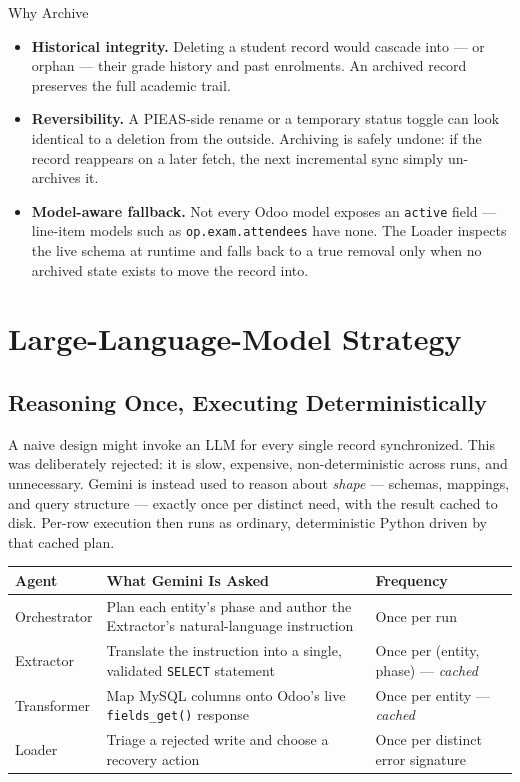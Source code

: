 \documentclass[11pt,a4paper]{article}
\begin{document}
\begin{principlebox}{Why Archive}
\begin{itemize}
  \item \textbf{Historical integrity.} Deleting a student record would cascade into --- or orphan --- their grade history and past enrolments. An archived record preserves the full academic trail.
  \item \textbf{Reversibility.} A PIEAS-side rename or a temporary status toggle can look identical to a deletion from the outside. Archiving is safely undone: if the record reappears on a later fetch, the next incremental sync simply un-archives it.
  \item \textbf{Model-aware fallback.} Not every Odoo model exposes an \texttt{active} field --- line-item models such as \texttt{op.exam.attendees} have none. The Loader inspects the live schema at runtime and falls back to a true removal only when no archived state exists to move the record into.
\end{itemize}
\end{principlebox}

\newpage
\section{Large-Language-Model Strategy}

\subsection{Reasoning Once, Executing Deterministically}
A naive design might invoke an LLM for every single record synchronized. This was deliberately rejected: it is slow, expensive, non-deterministic across runs, and unnecessary. Gemini is instead used to reason about \emph{shape} --- schemas, mappings, and query structure --- exactly once per distinct need, with the result cached to disk. Per-row execution then runs as ordinary, deterministic Python driven by that cached plan.

\begin{table}[h]
\centering
\begin{tabularx}{\textwidth}{@{}l>{\raggedright\arraybackslash}X l@{}}
\toprule
\rowcolor{navy!10}
\textbf{\color{navy}Agent} & \textbf{\color{navy}What Gemini Is Asked} & \textbf{\color{navy}Frequency} \\
\midrule
Orchestrator & Plan each entity's phase and author the Extractor's natural-language instruction & Once per run \\
Extractor & Translate the instruction into a single, validated \texttt{SELECT} statement & Once per (entity, phase) --- \emph{cached} \\
Transformer & Map MySQL columns onto Odoo's live \texttt{fields\_get()} response & Once per entity --- \emph{cached} \\
Loader & Triage a rejected write and choose a recovery action & Once per distinct error signature \\
\bottomrule
\end{tabularx}
\end{table}
\end{document}
